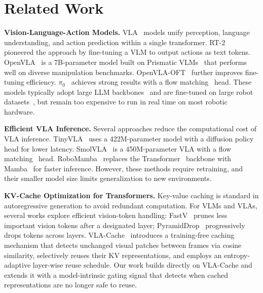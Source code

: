 \documentclass[letterpaper, 10 pt, conference]{ieeeconf}  %
\begin{document}
\section{Related Work}\label{sec:related}

\textbf{Vision-Language-Action Models.}
VLA~\cite{kim2024openvla,kim2025fine,black2024pi_0,zitkovich2023rt} models unify perception, language understanding, and action prediction
within a single transformer.
RT-2~\cite{zitkovich2023rt} pioneered the approach by fine-tuning a VLM to
output actions as text tokens.
OpenVLA~\cite{kim2024openvla} is a 7B-parameter model built on
Prismatic VLMs~\cite{karamcheti2024prismatic} that performs well on
diverse manipulation benchmarks.
OpenVLA-OFT~\cite{kim2025fine} further improves fine-tuning
efficiency. $\pi_0$~\cite{black2024pi_0} achieves strong results with a flow matching~\cite{lipman2022flow} head.
These models typically adopt large LLM backbones~\cite{touvron2023llama} and are fine-tuned on large robot datasets~\cite{o2024open},
but remain too expensive to run in real time on most robotic hardware.

\textbf{Efficient VLA Inference.}
Several approaches reduce the computational cost of VLA inference.
TinyVLA~\cite{wen2024tinyvla} uses a 422M-parameter model with a diffusion policy~\cite{chi2025diffusion} head for lower latency.
SmolVLA~\cite{shukor2025smolvla} is a 450M-parameter VLA with a flow matching~\cite{lipman2022flow} head.
RoboMamba~\cite{liurobomamba} replaces the Transformer~\cite{vaswani2017attention} backbone with Mamba~\cite{gu2024mamba} for faster inference.
However, these methods require retraining, and their smaller model size limits generalization to new environments. 

\textbf{KV-Cache Optimization for Transformers.}
Key-value caching is standard in autoregressive generation to avoid
redundant computation.
For VLMs and VLAs, several works explore efficient vision-token handling:
FastV~\cite{chen2024fastv} prunes less important vision tokens after a
designated layer;
PyramidDrop~\cite{tang2024pyramiddrop} progressively drops tokens across
layers.
VLA-Cache~\cite{xu2025vlacache} introduces a training-free caching
mechanism that detects unchanged visual patches between frames via cosine
similarity, selectively reuses their KV representations, and employs an
entropy-adaptive layer-wise reuse schedule.
Our work builds directly on VLA-Cache and extends it with a
model-intrinsic gating signal that detects when cached representations
are no longer safe to reuse.
\end{document}
